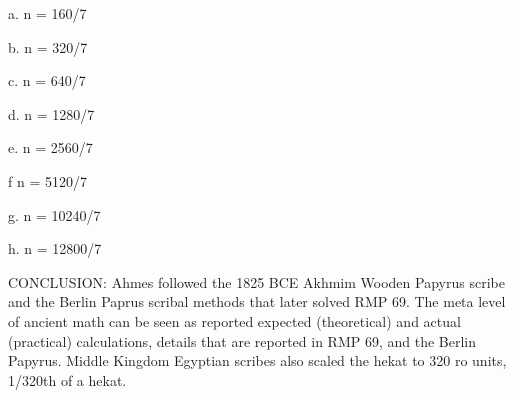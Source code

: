 \documentclass[12pt]{article}
\begin{document}
a. n = 160/7

b. n = 320/7

c. n = 640/7

d. n = 1280/7

e. n = 2560/7

f n = 5120/7

g. n = 10240/7

h. n = 12800/7

CONCLUSION: Ahmes followed the 1825 BCE Akhmim Wooden Papyrus scribe and the Berlin Paprus scribal methods that later solved RMP 69. The meta level of ancient math can be seen as reported expected (theoretical) and actual (practical) calculations, details that are reported in RMP 69, and the Berlin Papyrus. Middle Kingdom Egyptian scribes also scaled the hekat to 320 ro units, 1/320th of a hekat.


\end{document}

